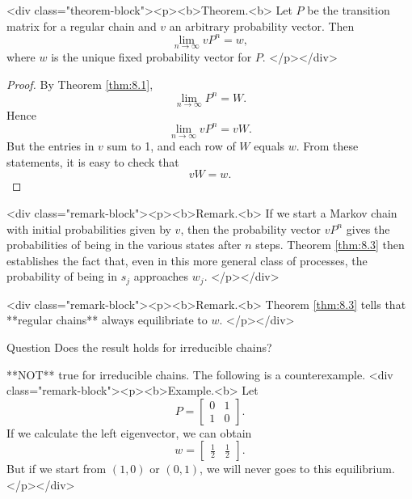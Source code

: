 <div class="theorem-block"><p><b>Theorem.<b> 
\label{thm:8.3}
Let $P$ be the transition matrix for a regular chain and $v$ an arbitrary probability vector. Then
$$\begin{equation}
    \lim_{n\to\infty} vP^n = w,
\end{equation}$$
where $w$ is the unique fixed probability vector for $P$.
</p></div>

\begin{proof}
By Theorem \ref{thm:8.1},
$$\begin{equation}
    \lim_{n\to\infty} P^n = W.
\end{equation}$$
Hence 
$$\begin{equation}
    \lim_{n\to\infty} vP^n = vW.
\end{equation}$$
But the entries in $v$ sum to 1, and each row of $W$ equals $w$. From these statements, it is easy to check that
$$\begin{equation}
    vW = w.
\end{equation}$$
\end{proof}

<div class="remark-block"><p><b>Remark.<b> 
If we start a Markov chain with initial probabilities given by $v$, then the probability vector $v P^n$ gives the probabilities of being in the various states after $n$ steps. Theorem \ref{thm:8.3} then establishes the fact that, even in this more general class of processes, the probability of being in $s_j$ approaches $w_j$.
</p></div>

<div class="remark-block"><p><b>Remark.<b> 
Theorem \ref{thm:8.3} tells that **regular chains** always equilibriate to $w$.
</p></div>

\begin{newnotion}{Question}
Does the result holds for irreducible chains?
\end{newnotion}
**NOT** true for irreducible chains. The following is a counterexample.
<div class="remark-block"><p><b>Example.<b> 
Let 
$$\begin{equation}
    P = \begin{bmatrix} 0 & 1 \\ 1 & 0 \end{bmatrix}.
\end{equation}$$
If we calculate the left eigenvector, we can obtain 
$$\begin{equation}
    w = \begin{bmatrix} \frac{1}{2} & \frac{1}{2} \end{bmatrix}.
\end{equation}$$
But if we start from $(1,0)$ or $(0,1)$, we will never goes to this equilibrium.
</p></div>

